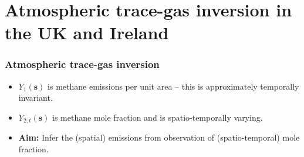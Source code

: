 \documentclass{beamer}
\newcommand{\svec} {\textbf{s}}
\newcommand{\uvec} {\textbf{u}}
\begin{document}

\section{Atmospheric trace-gas inversion in the UK and Ireland}


\begin{frame}
\sectionpage
\end{frame}

\begin{frame}
\frametitle{Atmospheric trace-gas inversion}

\begin{itemize}
\item $Y_1(\svec)$ is methane emissions per unit area -- this is approximately temporally invariant. \vfill
\item $Y_{2,t}(\svec)$ is methane mole fraction and is spatio-temporally varying. \vfill
\item {\bf Aim:} Infer the (spatial) emissions from observation of (spatio-temporal) mole fraction.\vfill
\end{itemize}
\end{frame}
\end{document}
